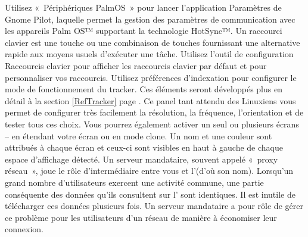 Utilisez «~Périphériques PalmOS~» pour lancer l'application Paramètres de Gnome Pilot, laquelle permet la gestion des paramètres de communication avec les appareils Palm OS™ supportant la technologie HotSync™. 
Un raccourci clavier est une touche ou une combinaison de touches fournissant une alternative rapide aux moyens usuels d'exécuter une tâche. Utilisez l'outil de configuration Raccourcis clavier pour afficher les raccourcis clavier par défaut et pour personnaliser vos raccourcis.
Utilisez préférences d'indexation pour configurer le mode de fonctionnement du tracker. Ces éléments seront développés plus en détail à la section \ref{RefTracker} page \pageref{RefTracker}.
Ce panel tant attendu des Linuxiens vous permet de configurer très facilement la résolution, la fréquence, l'orientation et de tester tous ces choix. Vous pourrez également activer un seul ou plusieurs écrans -- en étendant votre écran ou en mode clone. Un nom et une couleur sont attribués à chaque écran et ceux-ci sont visibles en haut à gauche de chaque espace d'affichage détecté.
Un serveur mandataire, souvent appelé «~proxy réseau~», joue le rôle d'intermédiaire entre vous et l'(d'où son nom). Lorsqu'un grand nombre d'utilisateurs exercent une activité commune, une partie conséquente des données qu'ils consultent sur l' sont identiques. Il est inutile de télécharger ces données plusieurs fois. Un serveur mandataire a pour rôle de gérer ce problème pour les utilisateurs d'un réseau de manière à économiser leur connexion.\\
